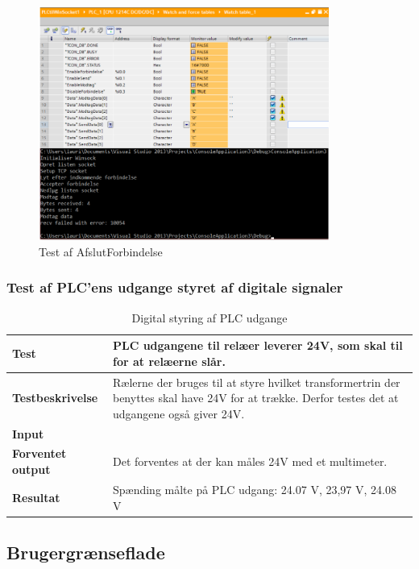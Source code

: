 \begin{figure}[H] %
	\centering
	\includegraphics[width=0.85\textwidth]{Test/ModultestStyringsenhed/AfslutForbindelse}
	\caption{Test af AfslutForbindelse}
	\label{fig:AfslutForbindelse}
\end{figure}

\subsubsection{Test af PLC'ens udgange styret af digitale signaler}

\begin{table}[H]
	\centering
	\begin{tabular}{ | m{} | m{}|} 
		\hline
		\textbf{Test}					&PLC udgangene til relæer leverer 24V, som skal til for at relæerne slår. \\ \hline
		\textbf{Testbeskrivelse}		&Rælerne der bruges til at styre hvilket transformertrin der benyttes skal have 24V for at trække. Derfor testes det at udgangene også giver 24V.\\ \hline
		\textbf{Input}					& \\ \hline
		\textbf{Forventet output}		&Det forventes at der kan måles 24V med et multimeter.\\ \hline
		\textbf{Resultat}				&Spænding målte på PLC udgang: 24.07 V, 23,97 V, 24.08 V   \\ \hline
	\end{tabular}
	\caption{Digital styring af PLC udgange} 
	\label{tab:PLCudgange}
\end{table}

\subsection{Brugergrænseflade}

